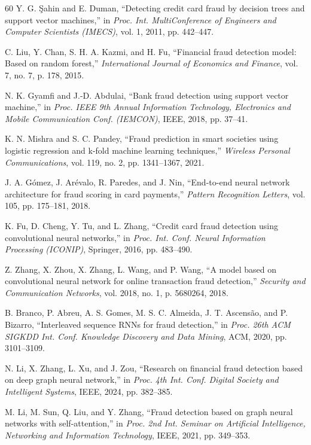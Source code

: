 \documentclass[10pt,a4paper,twocolumn]{article}
\begin{document}
\begin{thebibliography}{60}
 Y. G. \c{S}ahin and E. Duman, ``Detecting credit card fraud by decision trees and support vector machines,'' in \textit{Proc. Int. MultiConference of Engineers and Computer Scientists (IMECS)}, vol. 1, 2011, pp. 442--447.

 C. Liu, Y. Chan, S. H. A. Kazmi, and H. Fu, ``Financial fraud detection model: Based on random forest,'' \textit{International Journal of Economics and Finance}, vol. 7, no. 7, p. 178, 2015.

 N. K. Gyamfi and J.-D. Abdulai, ``Bank fraud detection using support vector machine,'' in \textit{Proc. IEEE 9th Annual Information Technology, Electronics and Mobile Communication Conf. (IEMCON)}, IEEE, 2018, pp. 37--41.

 K. N. Mishra and S. C. Pandey, ``Fraud prediction in smart societies using logistic regression and k-fold machine learning techniques,'' \textit{Wireless Personal Communications}, vol. 119, no. 2, pp. 1341--1367, 2021.

 J. A. G\'{o}mez, J. Ar\'{e}valo, R. Paredes, and J. Nin, ``End-to-end neural network architecture for fraud scoring in card payments,'' \textit{Pattern Recognition Letters}, vol. 105, pp. 175--181, 2018.

 K. Fu, D. Cheng, Y. Tu, and L. Zhang, ``Credit card fraud detection using convolutional neural networks,'' in \textit{Proc. Int. Conf. Neural Information Processing (ICONIP)}, Springer, 2016, pp. 483--490.

 Z. Zhang, X. Zhou, X. Zhang, L. Wang, and P. Wang, ``A model based on convolutional neural network for online transaction fraud detection,'' \textit{Security and Communication Networks}, vol. 2018, no. 1, p. 5680264, 2018.

 B. Branco, P. Abreu, A. S. Gomes, M. S. C. Almeida, J. T. Ascens\~{a}o, and P. Bizarro, ``Interleaved sequence RNNs for fraud detection,'' in \textit{Proc. 26th ACM SIGKDD Int. Conf. Knowledge Discovery and Data Mining}, ACM, 2020, pp. 3101--3109.

 N. Li, X. Zhang, L. Xu, and J. Zou, ``Research on financial fraud detection based on deep graph neural network,'' in \textit{Proc. 4th Int. Conf. Digital Society and Intelligent Systems}, IEEE, 2024, pp. 382--385.

 M. Li, M. Sun, Q. Liu, and Y. Zhang, ``Fraud detection based on graph neural networks with self-attention,'' in \textit{Proc. 2nd Int. Seminar on Artificial Intelligence, Networking and Information Technology}, IEEE, 2021, pp. 349--353.


\end{thebibliography}
\end{document}
